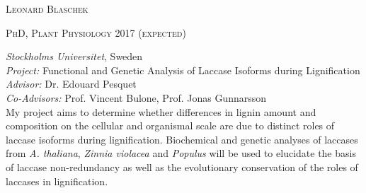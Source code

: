 \documentclass[11pt]{article}
\begin{document}
	\setlength\parindent{15pt}
\begin{center}
	\huge{\textsc{Leonard Blaschek}}
	\vspace*{1cm}
\end{center}

\vspace{0.2cm}

\textsc{\large{PhD, Plant Physiology}} \hfill \textsc{2017 \textnormal{(expected)}}
\begin{addmargin}[24pt]{0pt}
	\textit{Stockholms Universitet}, Sweden \\
	\textit{Project:} Functional and Genetic Analysis of Laccase Isoforms during Lignification \\
	\textit{Advisor:} Dr. Edouard Pesquet \\
	\textit{Co-Advisors:} Prof. Vincent Bulone, Prof. Jonas Gunnarsson
	\vspace{0.1cm} \\
	\small{My project aims to determine whether differences in lignin amount and composition on the cellular and organismal scale are due to distinct roles of laccase isoforms during lignification. Biochemical and genetic analyses of laccases from \textit{A. thaliana}, \textit{Zinnia violacea} and \textit{Populus} will be used to elucidate the basis of laccase non-redundancy as well as the evolutionary conservation of the roles of laccases in lignification.}
\end{addmargin}
\vspace{0.5cm}
\end{document}
